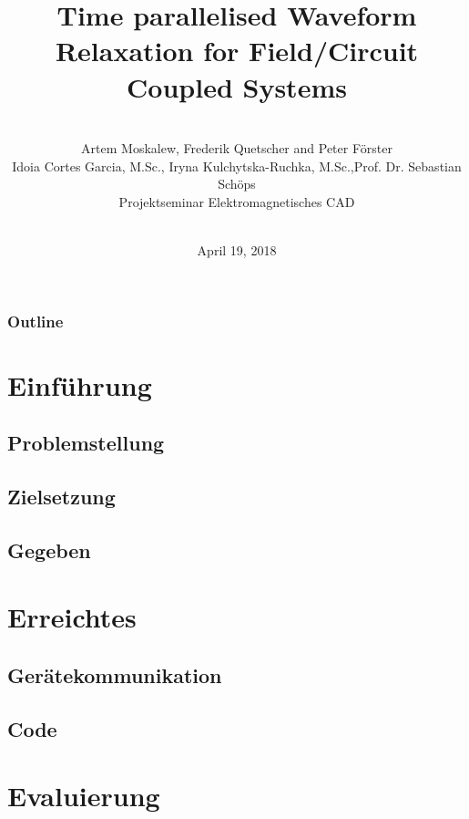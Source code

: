 \documentclass[colorbacktitle,inverttitle,landscape,presentation,
	english,
	aspectratio=43, %
	accentcolor=tud9b, %
]{tudbeamer}
\date{April 19, 2018}
\title{Time parallelised Waveform Relaxation for Field/Circuit Coupled Systems}
\subtitle{\\[0.3\baselineskip]
	Artem Moskalew, Frederik Quetscher and Peter Förster\\[0.3\baselineskip]
{\small Idoia Cortes Garcia, M.Sc., Iryna Kulchytska-Ruchka, M.Sc.,\linebreak Prof. Dr. Sebastian Schöps}\\
[0.3\baselineskip]
{\tiny Projektseminar Elektromagnetisches CAD}\\[0.3em]
	\mbox{\scriptsize}~}
\institute[TU Darmstadt | Fachbereich 18 | Institut Theorie Elektromagnetischer Felder]{Institut für Theorie Elektromagnetischer Felder, TU Darmstadt}
\begin{document}
	
\begin{titleframe}
	\end{titleframe}
	
\begin{frame}
	\frametitle{Outline}
	\tableofcontents%
\end{frame}
	

\section{Einführung}

\subsection{Problemstellung}


\subsection{Zielsetzung}


\subsection{Gegeben}


\section{Erreichtes}

\subsection{Gerätekommunikation}


\subsection{Code}


\section{Evaluierung}
\end{document}
